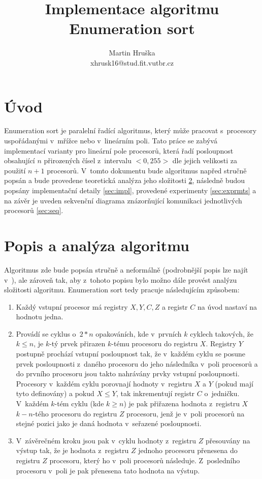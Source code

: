 \documentclass[a4paper, 12pt]{article}
\title{Implementace algoritmu Enumeration sort}
\author{Martin Hruška\\xhrusk16@stud.fit.vutbr.cz}
\date{}
\begin{document}
\maketitle

\section{Úvod}
\label{sec:intro}
Enumeration sort je paralelní řadící algoritmus, který může pracovat s~procesory uspořádanými v~mřížce nebo v~lineárním poli.
Tato práce se zabývá implementací varianty pro lineární pole procesorů, která řadí
posloupnost obsahující $n$ přirozených čísel z~intervalu $<0,255>$ dle jejich velikosti za použití $n+1$ procesorů. 
V~tomto dokumentu bude algoritmus napřed
stručně popsán a bude provedene teoretická analýza jeho složitosti \ref{sec:analysis},
následně budou popsány implementační detaily \ref{sec:impl},
provedené experimenty \ref{sec:exprmts}
a na závěr je uveden sekvenční diagrama znázorňující komunikaci jednotlivých procesorů \ref{sec:seq}.

\section{Popis a analýza algoritmu}
\label{sec:analysis}
Algoritmus zde bude popsán stručně a neformálně (podrobnější popis lze najít v~\cite{prl:pred}),
ale zároveň tak, aby z~tohoto popisu bylo možno dále provést analýzu složitosti algoritmu.
Enumeration sort tedy pracuje následujícím způsobem:
\begin{enumerate}
\item Každý vstupní procesor má registry $X, Y, C, Z$ a registr $C$ na úvod nastaví
na hodnotu jedna.
\item Provádí se cyklus o~$2*n$ opakováních, kde v~prvních $k$ cyklech takových, že $k\leq n$,
je $k$-tý prvek přirazen $k$-tému procesoru do registru $X$.
Registry $Y$ postupně prochází vstupní posloupnost tak, že v~každém cyklu se posune prvek posloupnosti z~daného procesoru
do jeho následníka v~poli procesorů a do prvního procesoru jsou takto nahrávány prvky vstupní posloupnosti.
Procesory v~každém cyklu porovnají hodnoty v~registru $X$ a $Y$ (pokud mají tyto definovány)
a pokud $X \leq Y$, tak inkrementují registr $C$ o~jedničku.
V~každém $k$-tém cyklu (kde $k \geq n$) je pak přiřazena hodnota z~registru $X$ $k-n$-tého procesoru do registru $Z$ procesoru,
jenž je v~poli procesorů na stejné pozici jako je daná hodnota v~seřazené posloupnosti.
\item V~závěrečném kroku jsou pak v~cyklu hodnoty z~registru $Z$ přesouvány na výstup tak, že je hodnota
z~registru $Z$ jednoho procesoru přenesena do registru $Z$ procesoru, který ho v~poli procesorů následuje.
Z~posledního procesoru v~poli je pak přenesena tato hodnota na výstup.
\end{enumerate}
\end{document}
